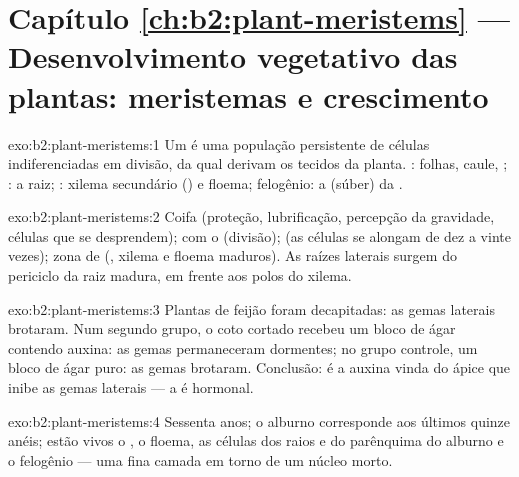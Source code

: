 \section*{Capítulo \ref{ch:b2:plant-meristems} --- Desenvolvimento vegetativo das plantas: meristemas e crescimento}

\begin{solution}{exo:b2:plant-meristems:1}
Um  é uma população persistente de células indiferenciadas em
divisão, da qual derivam os tecidos da planta. : folhas, caule, ; : a raiz;
: xilema secundário () e floema; felogênio: a
 (súber) da .
\end{solution}

\begin{solution}{exo:b2:plant-meristems:2}
Coifa (proteção, lubrificação, percepção da gravidade, células que se
desprendem);  com o  (divisão);  (as células se alongam de dez a vinte vezes); zona de
 (, xilema e floema maduros). As raízes
laterais surgem do periciclo da raiz madura, em frente aos polos do
xilema.
\end{solution}

\begin{solution}{exo:b2:plant-meristems:3}
Plantas de feijão foram decapitadas: as gemas laterais brotaram. Num
segundo grupo, o coto cortado recebeu um bloco de ágar contendo
auxina: as gemas permaneceram dormentes; no grupo controle, um bloco
de ágar puro: as gemas brotaram. Conclusão: é a auxina vinda do ápice
que inibe as gemas laterais --- a  é hormonal.
\end{solution}

\begin{solution}{exo:b2:plant-meristems:4}
Sessenta anos; o alburno corresponde aos últimos quinze anéis; estão
vivos o , o floema, as células dos raios e do parênquima do
alburno e o felogênio --- uma fina camada em torno de um núcleo morto.
\end{solution}

